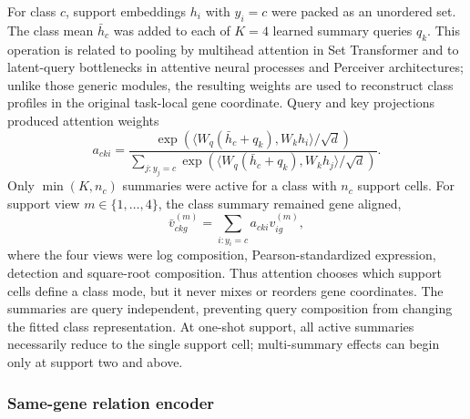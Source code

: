 \documentclass[12pt]{article}
\begin{document}
For class $c$, support embeddings $h_i$ with $y_i=c$ were packed as an unordered set. The class mean $\bar h_c$ was added to each of $K=4$ learned summary queries $q_k$. This operation is related to pooling by multihead attention in Set Transformer and to latent-query bottlenecks in attentive neural processes and Perceiver architectures\cite{lee2019settransformer,kim2019anp,jaegle2021perceiver}; unlike those generic modules, the resulting weights are used to reconstruct class profiles in the original task-local gene coordinate. Query and key projections produced attention weights
\begin{equation}
a_{cki}=\frac{\exp\left(\langle W_q(\bar h_c+q_k),W_kh_i\rangle/\sqrt{d}\right)}{\sum_{j:y_j=c}\exp\left(\langle W_q(\bar h_c+q_k),W_kh_j\rangle/\sqrt{d}\right)}.
\end{equation}
Only $\min(K,n_c)$ summaries were active for a class with $n_c$ support cells. For support view $m\in\{1,\ldots,4\}$, the class summary remained gene aligned,
\begin{equation}
 \bar v^{(m)}_{ckg}=\sum_{i:y_i=c}a_{cki}v^{(m)}_{ig},
\end{equation}
where the four views were log composition, Pearson-standardized expression, detection and square-root composition. Thus attention chooses which support cells define a class mode, but it never mixes or reorders gene coordinates. The summaries are query independent, preventing query composition from changing the fitted class representation. At one-shot support, all active summaries necessarily reduce to the single support cell; multi-summary effects can begin only at support two and above.

\subsubsection*{Same-gene relation encoder}
\end{document}
